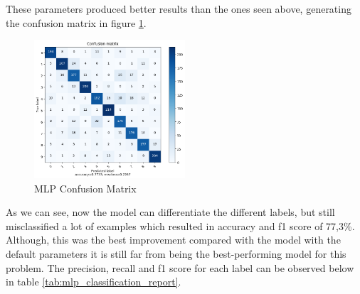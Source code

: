 \documentclass[conference]{IEEEtran}
\begin{document}
These parameters produced better results than the ones seen above, generating the confusion matrix in figure \ref{fig:mlp_confusion_matrix}.

\begin{figure}[!h]
    \centering
    \includegraphics[width=0.5\textwidth]{assets/mlp-confusion-matrix.png}
    \caption{MLP Confusion Matrix}
    \label{fig:mlp_confusion_matrix}
\end{figure}

As we can see, now the model can differentiate the different labels, but still misclassified a lot of examples which resulted in accuracy and f1 score of 77,3\%.
Although, this was the best improvement compared with the model with the default parameters it is still far from being the best-performing model for this problem.
The precision, recall and f1 score for each label can be observed below in table \ref{tab:mlp_classification_report}.
\end{document}
